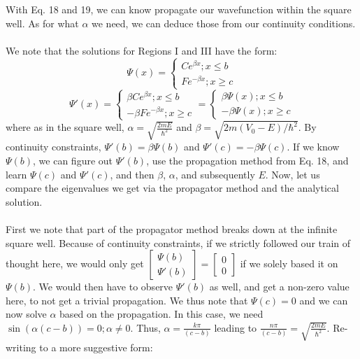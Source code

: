 \documentclass[10pt]{article} %
\begin{document}
\noindent With Eq. 18 and 19, we can know propagate our wavefunction within the square well. As for what $\alpha$ we need, we can deduce those from our continuity conditions.
\\ \\
\noindent We note that the solutions for Regions I and III have the form:
\begin{equation}
\Psi (x) = 
\begin{cases}
	Ce^{\beta x}; x \leq b\\
	Fe^{ - \beta x}; x \geq c
\end{cases}
\end{equation}
\begin{equation}
\Psi' (x) = 
\begin{cases}
	\beta Ce^{\beta x}; x \leq b\\
	-\beta Fe^{ - \beta x}; x\geq c
\end{cases}
=
\begin{cases}
	\beta \Psi(x); x \leq b\\
	-\beta \Psi(x); x\geq c
\end{cases}
\end{equation}
\noindent where as in the square well, $\alpha = \sqrt{\frac{2mE}{\hbar ^{2}}}$ and $\beta = \sqrt{2m(V_{0} - E) / \hbar ^2}$. By continuity constraints, $\Psi' (b) = \beta\Psi(b)$ and  $\Psi' (c) = -\beta\Psi(c)$. If we know $\Psi (b)$, we can figure out $\Psi' (b)$, use the propagation method from Eq. 18, and learn $\Psi (c)$ and $\Psi'(c)$, and then $\beta$, $\alpha$, and subsequently $E$.
\newpage
\noindent Now, let us compare the eigenvalues  we get via the propagator method and the analytical solution.
\\ \\ First we note that part of the propagator method breaks down at the infinite square well. Because of continuity constraints, if we strictly followed our train of thought here, we would only get $\left[ \begin{array}{c} \Psi(b) \\ \Psi'(b)\end{array}\right] =\left[ \begin{array}{c} 0 \\ 0\end{array}\right]$ if we solely based it on $\Psi (b)$. We would then have to observe $\Psi' (b)$ as well, and get a non-zero value here, to not get a trivial propagation. We thus note that $\Psi(c) = 0$ and we can now solve $\alpha$ based on the propagation.  In this  case, we need $\sin(\alpha (c-b))= 0; \alpha \neq 0$. Thus, $\alpha = \frac{k \pi}{(c-b)}$ leading to $\frac{n\pi}{(c-b)} = \sqrt{\frac{2mE}{\hbar ^{2}}}$. Re-writing to a more suggestive form:
\end{document}
